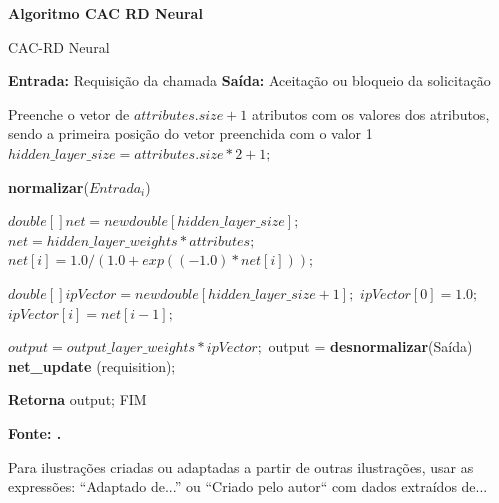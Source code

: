 \begin{center}	
        \textbf{Algoritmo CAC RD Neural}
	\vspace{-0.3cm}
\begin{minipage}[ht]{13cm}
\begin{algorithm}[H]
  \footnotesize
  \caption{CAC-RD Neural}
  \label{alg:rnagenerica}
  \begin{algorithmic}[1]
      \STATE \textbf{Entrada:} Requisição da chamada
    \STATE \textbf{Saída:} Aceitação ou bloqueio da solicitação
    
    \STATE Preenche o vetor de $attributes.size+1$ atributos com os valores dos atributos, sendo a primeira posição do vetor preenchida com o valor 1
		\STATE $hidden\_layer\_size =  attributes.size*2+1;$

    	\STATE \textbf{normalizar}($Entrada_i$)
    \ENDFOR

		\STATE $double [] net = new double [hidden\_layer\_size];$
    \STATE $net = hidden\_layer\_weights * attributes;$
			\STATE $net [i] = 1.0 / (1.0 + exp((-1.0)*net[i]));$
		\ENDFOR

		\STATE $double [] ipVector = new double [hidden\_layer\_size+1];$
    \STATE $ipVector [0] = 1.0;$
			\STATE $ipVector [i] = net [i-1];$
		\ENDFOR
		
		\STATE $output = output\_layer\_weights *  ipVector;$
    \STATE output = \textbf{desnormalizar}(Saída)
    \STATE \textbf{net\_update} (requisition);
    
    \STATE \textbf{Retorna} output; FIM
  \end{algorithmic}
\end{algorithm}

\small \centering \textbf{\footnotesize Fonte: \cite{mestrado}.}
\end{minipage}
\end{center}

Para ilustrações criadas ou adaptadas a partir de outras ilustrações, usar as expressões: 
“Adaptado de...” ou “Criado pelo autor`` com dados extraídos de...
   
